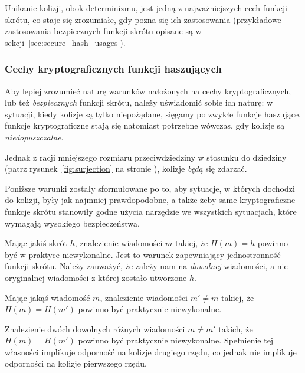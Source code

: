 \documentclass[12pt,a4paper,twoside]{article}
\begin{document}
Unikanie kolizji, obok determinizmu, jest jedną z najważniejszych cech funkcji
skrótu, co staje się zrozumiałe, gdy pozna się ich zastosowania (przykładowe
zastosowania bezpiecznych funkcji skrótu opisane są w
sekcji~\ref{sec:secure_hash_usages}).

\subsubsection{Cechy kryptograficznych funkcji haszujących}
\label{sec:secure_hash_attributes}
Aby lepiej zrozumieć naturę warunków nałożonych na cechy kryptograficznych, lub
też \emph{bezpiecznych} funkcji skrótu, należy uświadomić sobie ich naturę: w
sytuacji, kiedy kolizje są tylko niepożądane, sięgamy po zwykłe funkcje
haszujące, funkcje kryptograficzne stają się natomiast potrzebne wówczas, gdy
kolizje są \emph{niedopuszczalne}.

Jednak z racji mniejszego rozmiaru przeciwdziedziny w stosunku do dziedziny
(patrz rysunek~\ref{fig:surjection} na stronie \pageref{fig:surjection}),
kolizje \emph{będą} się zdarzać.

Poniższe warunki zostały sformułowane po to, aby sytuacje, w których dochodzi
do kolizji, były jak najmniej prawdopodobne, a także żeby same kryptograficzne
funkcje skrótu stanowiły godne użycia narzędzie we wszystkich sytuacjach, które
wymagają wysokiego bezpieczeństwa.

\label{sec:preimage_resistance}
Mając jakiś skrót $h$, znalezienie wiadomości $m$ takiej, że $H(m) = h$ powinno
być w praktyce niewykonalne. Jest to warunek zapewniający jednostronność
funkcji skrótu.
Należy zauważyć, że zależy nam na \emph{dowolnej} wiadomości, a nie oryginalnej
wiadomości z której zostało utworzone $h$.

\label{sec:second_preimage_resistance}
Mając jakąś wiadomość $m$, znalezienie wiadomości $m' \neq m$ takiej, że $H(m)
= H(m')$ powinno być praktycznie niewykonalne.

\label{sec:collision_resistance}
Znalezienie dwóch dowolnych różnych wiadomości $m \neq m'$ takich, że $H(m) =
H(m')$ powinno być praktycznie niewykonalne.
Spełnienie tej własności implikuje odporność na kolizje drugiego rzędu, co
jednak nie implikuje odporności na kolizje pierwszego rzędu.
\end{document}
